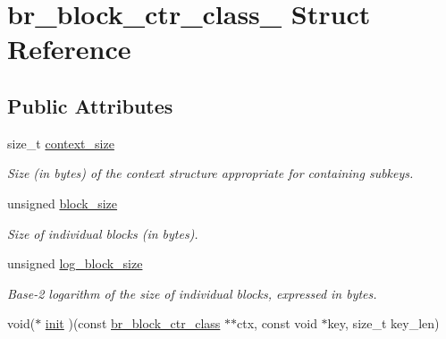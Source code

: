 \hypertarget{structbr__block__ctr__class__}{}\section{br\+\_\+block\+\_\+ctr\+\_\+class\+\_\+ Struct Reference}
\label{structbr__block__ctr__class__}
\subsection*{Public Attributes}
\begin{DoxyCompactItemize}
\item 
\mbox{\label{structbr__block__ctr__class___a5ab70fc09d3f896286db4d9ab141b687}} 
size\+\_\+t \hyperlink{structbr__block__ctr__class___a5ab70fc09d3f896286db4d9ab141b687}{context\+\_\+size}
\begin{DoxyCompactList}\small\item\em Size (in bytes) of the context structure appropriate for containing subkeys. \end{DoxyCompactList}\item 
\mbox{\label{structbr__block__ctr__class___a5855b6805ea76905618791a911deeefc}} 
unsigned \hyperlink{structbr__block__ctr__class___a5855b6805ea76905618791a911deeefc}{block\+\_\+size}
\begin{DoxyCompactList}\small\item\em Size of individual blocks (in bytes). \end{DoxyCompactList}\item 
\mbox{\label{structbr__block__ctr__class___a9d839e9063043a3e7389d57b61c9c09e}} 
unsigned \hyperlink{structbr__block__ctr__class___a9d839e9063043a3e7389d57b61c9c09e}{log\+\_\+block\+\_\+size}
\begin{DoxyCompactList}\small\item\em Base-\/2 logarithm of the size of individual blocks, expressed in bytes. \end{DoxyCompactList}\item 
void($\ast$ \hyperlink{structbr__block__ctr__class___aa18275294e3f478f7f348be2e0acb989}{init} )(const \hyperlink{bearssl__block_8h_a8934ac58af503220bfb6e6cbc2cfb209}{br\+\_\+block\+\_\+ctr\+\_\+class} $\ast$$\ast$ctx, const void $\ast$key, size\+\_\+t key\+\_\+len)
$$
\end{DoxyCompactItemize}
